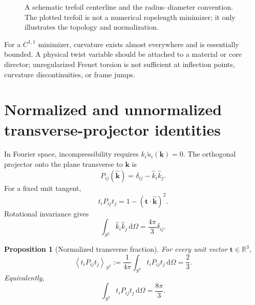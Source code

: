 \documentclass[aps,pre,preprint,notitlepage,nofootinbib,superscriptaddress]{revtex4-2}
\newcommand{\dd}{\mathrm d}
\newcommand{\RR}{\mathbb R}
\newcommand{\Rop}{\operatorname{Rop}}
\newcommand{\calL}{\mathcal L}
\newcommand{\unitvec}[1]{\widehat{\bm #1}}
\newtheorem{proposition}{Proposition}
\begin{document}
\begin{figure}[t]
\caption{A schematic trefoil centerline and the radius--diameter convention.  The plotted trefoil is not a numerical ropelength minimizer; it only illustrates the topology and normalization.}
\label{fig:trefoil-convention}
\end{figure}

For a $C^{1,1}$ minimizer, curvature exists almost everywhere and is essentially bounded.  A physical twist variable should be attached to a material or core director; unregularized Frenet torsion is not sufficient at inflection points, curvature discontinuities, or frame jumps.

\section{Normalized and unnormalized transverse-projector identities}
\label{sec:projector}

In Fourier space, incompressibility requires $k_i\widetilde u_i(\bm k)=0$.  The orthogonal projector onto the plane transverse to $\bm k$ is
\begin{equation}
  P_{ij}(\unitvec{k})=\delta_{ij}-\widehat k_i\widehat k_j.
  \label{eq:projector-v020}
\end{equation}
For a fixed unit tangent,
\begin{equation}
  t_iP_{ij}t_j=1-(\bm t\cdot\unitvec{k})^2.
\end{equation}
Rotational invariance gives
\begin{equation}
  \int_{S^2}\widehat k_i\widehat k_j\,\dd\Omega
  =\frac{4\pi}{3}\delta_{ij}.
\end{equation}

\begin{proposition}[Normalized transverse fraction]
For every unit vector $\bm t\in\RR^3$,
\begin{equation}
  \boxed{
  \left\langle t_iP_{ij}t_j\right\rangle_{S^2}
  :=\frac{1}{4\pi}\int_{S^2}t_iP_{ij}t_j\,\dd\Omega
  =\frac23.}
  \label{eq:normalized-23}
\end{equation}
Equivalently,
\begin{equation}
  \boxed{\int_{S^2}t_iP_{ij}t_j\,\dd\Omega=\frac{8\pi}{3}.}
  \label{eq:unnormalized-8pi3}
\end{equation}
\end{proposition}
\end{document}
